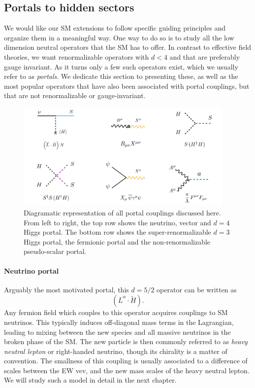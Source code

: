\subsection{Portals to hidden sectors}

We would like our SM extensions to follow specific guiding principles and organize them in a meaningful way. One way to do so is to study all the low dimension neutral operators that the SM has to offer. In contrast to effective field theories, we want renormalizable operators with $d<4$ and that are preferably gauge invariant. As it turns only a few such operators exist, which we usually refer to as \emph{portals}. We dedicate this section to presenting these, as well as the most popular operators that have also been associated with portal couplings, but that are not renormalizable or gauge-invariant.
%
\begin{figure}[t]
 \includegraphics[width=0.95\textwidth]{Dark_portals.pdf}
 \caption[Diagramatic representation of the portal couplings discussed.]{Diagramatic representation of all portal couplings discussed here. From left to right, the top row shows the neutrino, vector and $d=4$ Higgs portal. The bottom row shows the super-renormalizable $d=3$ Higgs portal, the fermionic portal and the non-renormalizable pseudo-scalar portal. \label{fig:all_portals}}
\end{figure}
%

\paragraph{Neutrino portal} Arguably the most motivated portal, this $d=5/2$ operator can be written as
\begin{equation}
\left( \overline{L}^\alpha \cdot \tilde{H}\right).%
\end{equation}
%
Any fermion field which couples to this operator acquires couplings to SM neutrinos. This typically induces off-diagonal mass terms in the Lagrangian, leading to mixing between the new species and all massive neutrinos in the broken phase of the SM. The new particle is then commonly referred to as \emph{heavy neutral lepton} or right-handed neutrino, though its chirality is a matter of convention. The smallness of this coupling is usually associated to a difference of scales between the EW vev, and the new mass scales of the heavy neutral lepton. We will study such a model in detail in the next chapter.

